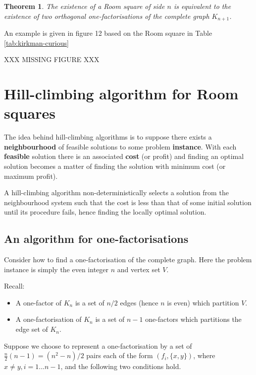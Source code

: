 \documentclass[
  11pt,
  a4paper]{book}
\newtheorem{theorem}{Theorem}
\begin{document}
\begin{theorem}
The existence of a Room square of side $n$
is equivalent to the existence of two orthogonal
one-factorisations of the complete graph $K_{n+1}$.
\end{theorem}

An example is given in figure 12 based on the Room square
in Table
\ref{tab:kirkman-curious}

XXX MISSING FIGURE XXX

\hypertarget{hill-climbing-algorithm-for-room-squares}{%
\section{Hill-climbing algorithm for Room squares}\label{hill-climbing-algorithm-for-room-squares}}

The idea behind hill-climbing algorithms is to suppose
there exists a \textbf{neighbourhood} of feasible solutions to
some problem \textbf{instance}. With each \textbf{feasible} solution
there is an associated \textbf{cost} (or profit) and finding
an optimal solution becomes a matter of finding the solution
with minimum cost (or maximum profit).

A hill-climbing algorithm non-deterministically selects a
solution from the neighbourhood system such that the cost
is less than that of some initial solution until its
procedure fails, hence finding the locally optimal solution.

\hypertarget{an-algorithm-for-one-factorisations}{%
\subsection{An algorithm for one-factorisations}\label{an-algorithm-for-one-factorisations}}

Consider how to find a one-factorisation of the complete
graph. Here the problem instance is simply the even integer
\(n\) and vertex set \(V\).

Recall:

\begin{itemize}
\item
  A one-factor of \(K_n\) is a set of \(n/2\) edges (hence
  \(n\) is even) which partition \(V\).
\item
  A one-factorisation of \(K_n\) is a set of \(n - 1\) one-factors which partitions the edge set of \(K_n\).
\end{itemize}

Suppose we choose to represent a one-factorisation by a set
of \(\frac{n}{2}(n - 1) = (n^2 - n)/2\) pairs each of the form
\((f_i, \{x, y\})\), where \(x \neq y, i = 1 ... n - 1\),
and the following two conditions hold.
\end{document}
